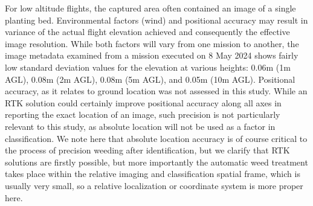 \documentclass[letterpaper, notitlepage]{report}
\begin{document}
%
For low altitude flights, the captured area often contained an image of a single planting bed. Environmental factors (wind) and positional accuracy may result in variance of the actual flight elevation achieved and consequently the effective image resolution. While both factors will vary from one mission to another, the image metadata examined from a mission executed on 8 May 2024 shows fairly low standard deviation values for the elevation  at various heights: 0.06m (1m AGL), 0.08m (2m AGL), 0.08m (5m AGL), and 0.05m (10m AGL). Positional accuracy, as it relates to ground location was not assessed in this study. While an RTK solution could certainly improve positional accuracy along all axes in reporting the exact location of an image, such precision is not particularly relevant to this study, as absolute location will not be used as a factor in classification. We note here that absolute location accuracy is of course critical to the process of precision weeding after identification, but we clarify that RTK solutions are firstly possible, but more importantly the automatic weed treatment takes place within the relative imaging and classification spatial frame, which is usually very small, so a relative localization or coordinate system is more proper here.
\end{document}
